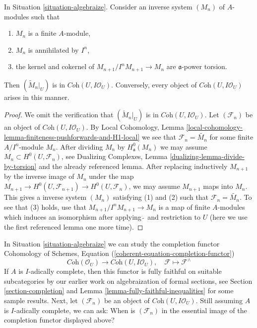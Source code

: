 \begin{lemma}
\label{lemma-system-of-modules}
In Situation \ref{situation-algebraize}.
Consider an inverse system $(M_n)$ of $A$-modules such
that
\begin{enumerate}
\item $M_n$ is a finite $A$-module,
\item $M_n$ is annihilated by $I^n$,
\item the kernel and cokernel of $M_{n + 1}/I^nM_{n + 1} \to M_n$
are $\mathfrak a$-power torsion.
\end{enumerate}
Then $(\widetilde{M}_n|_U)$ is in $\textit{Coh}(U, I\mathcal{O}_U)$.
Conversely, every object of $\textit{Coh}(U, I\mathcal{O}_U)$
arises in this manner.
\end{lemma}

\begin{proof}
We omit the verification that $(\widetilde{M}_n|_U)$ is in
$\textit{Coh}(U, I\mathcal{O}_U)$. Let $(\mathcal{F}_n)$
be an object of $\textit{Coh}(U, I\mathcal{O}_U)$.
By Local Cohomology, Lemma
\ref{local-cohomology-lemma-finiteness-pushforwards-and-H1-local}
we see that $\mathcal{F}_n = \widetilde{M_n}$ for some finite
$A/I^n$-module $M_n$. After dividing $M_n$ by $H^0_\mathfrak a(M_n)$
we may assume $M_n \subset H^0(U, \mathcal{F}_n)$, see
Dualizing Complexes, Lemma \ref{dualizing-lemma-divide-by-torsion}
and the already referenced lemma.
After replacing inductively $M_{n + 1}$ by the inverse image
of $M_n$ under the map $M_{n + 1} \to H^0(U, \mathcal{F}_{n + 1})
\to H^0(U, \mathcal{F}_n)$, we may assume $M_{n + 1}$ maps into
$M_n$. This gives a inverse system $(M_n)$ satisfying (1) and (2)
such that $\mathcal{F}_n = \widetilde{M_n}$. To see that (3)
holds, use that $M_{n + 1}/I^nM_{n + 1} \to M_n$ is a map
of finite $A$-modules which induces an isomorphism after
applying $\widetilde{\ }$ and restriction to $U$
(here we use the first referenced lemma one more time).
\end{proof}

\noindent
In Situation \ref{situation-algebraize} we can study the completion functor
Cohomology of Schemes, Equation (\ref{coherent-equation-completion-functor})
\begin{equation}
\label{equation-completion}
\textit{Coh}(\mathcal{O}_U)
\longrightarrow
\textit{Coh}(U, I\mathcal{O}_U),\quad
\mathcal{F} \longmapsto \mathcal{F}^\wedge
\end{equation}
If $A$ is $I$-adically complete, then this functor is fully faithful
on suitable subcategories by our earlier work on algebraization of
formal sections, see Section \ref{section-completion} and
Lemma \ref{lemma-fully-faithful-inequalities} for some sample results.
Next, let $(\mathcal{F}_n)$ be an object of $\textit{Coh}(U, I\mathcal{O}_U)$.
Still assuming $A$ is $I$-adically complete, we can ask:
When is $(\mathcal{F}_n)$ in the essential image of the completion
functor displayed above?

